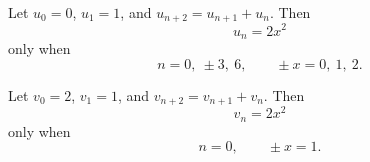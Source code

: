 \begin{proposition}
Let $u_0=0$, $u_1=1$, and $u_{n+2}=u_{n+1}+u_n$. Then
\[
    u_n=2x^2
\]
only when
\[
    n=0,\ \pm3,\ 6,\qquad \pm x=0,\ 1,\ 2.
\]
\end{proposition}

\begin{proposition}
Let $v_0=2$, $v_1=1$, and $v_{n+2}=v_{n+1}+v_n$. Then
\[
    v_n=2x^2
\]
only when
\[
    n=0,\qquad \pm x=1.
\]
\end{proposition}
